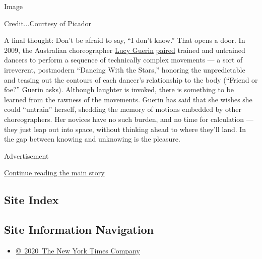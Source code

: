 Image

Credit...Courtesy of Picador

A final thought: Don't be afraid to say, ``I don't know.'' That opens a
door. In 2009, the Australian choreographer
\href{https://www.nytimes3xbfgragh.onion/2018/10/09/arts/lucy-guerin-tere-oconnor.html}{Lucy
Guerin} \href{https://vimeo.com/88420801}{paired} trained and untrained
dancers to perform a sequence of technically complex movements --- a
sort of irreverent, postmodern ``Dancing With the Stars,'' honoring the
unpredictable and teasing out the contours of each dancer's relationship
to the body (``Friend or foe?'' Guerin asks). Although laughter is
invoked, there is something to be learned from the rawness of the
movements. Guerin has said that she wishes she could ``untrain''
herself, shedding the memory of motions embedded by other
choreographers. Her novices have no such burden, and no time for
calculation --- they just leap out into space, without thinking ahead to
where they'll land. In the gap between knowing and unknowing is the
pleasure.

Advertisement

\protect\hyperlink{after-bottom}{Continue reading the main story}

\hypertarget{site-index}{%
\subsection{Site Index}\label{site-index}}

\hypertarget{site-information-navigation}{%
\subsection{Site Information
Navigation}\label{site-information-navigation}}

\begin{itemize}
\tightlist
\item
  \href{https://help.nytimes3xbfgragh.onion/hc/en-us/articles/115014792127-Copyright-notice}{©~2020~The
  New York Times Company}
\end{itemize}


